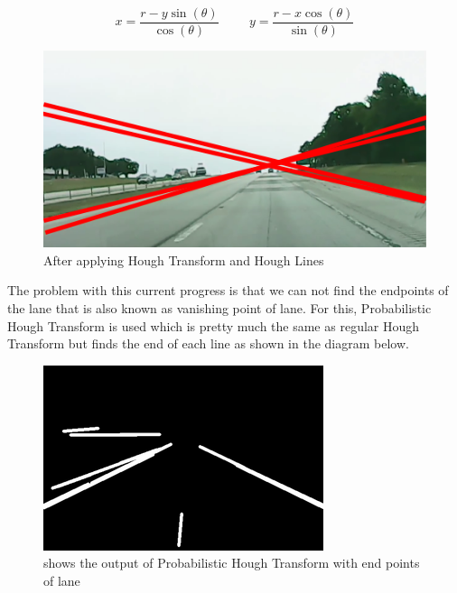 \begin{equation}
    x = \frac{r - y\sin(\theta)}{\cos(\theta)} \hspace{1cm} y = \frac{r - x
    \cos(\theta)}{\sin(\theta)}
\end{equation}

\begin{figure}
\begin{center}
    \includegraphics[scale=0.6]{img/lane7.png}
\end{center}
\caption{After applying Hough Transform and Hough Lines}
\label{fig:lane7}
\end{figure}

The problem with this current progress is that we can not find the endpoints of the lane that is also known as vanishing point of lane. For this, Probabilistic Hough Transform \cite{lane4} is used which is pretty much the same as regular Hough Transform but finds the end of each line as shown in the diagram below.


\begin{figure}
\begin{center}
    \includegraphics[scale=0.6]{img/lane8.png}
\end{center}
\caption{shows the output of Probabilistic Hough Transform with end points of lane}
\label{fig:lane8}
\end{figure}

